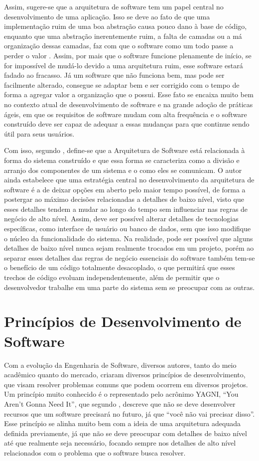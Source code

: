 \documentclass[12pt, %
openright, 
oneside, %
a4paper,    %
brazil]{facom-ufu-abntex2}
\begin{document}
Assim, sugere-se que a arquitetura de software tem um papel central no desenvolvimento de uma aplicação. Isso se deve ao fato de que uma implementação ruim de uma boa abstração causa pouco dano à base de código, enquanto que uma abstração inerentemente ruim, a falta de camadas ou a má organização dessas camadas, faz com que o software como um todo passe a perder o valor \cite{KIEHL}. Assim, por mais que o software funcione plenamente de início, se for impossível de mudá-lo devido a uma arquitetura ruim, esse software estará fadado ao fracasso. Já um software que não funciona bem, mas pode ser facilmente alterado, consegue se adaptar bem e ser corrigido com o tempo de forma a agregar valor a organização que o possui. Esse fato se encaixa muito bem no contexto atual de desenvolvimento de software e na grande adoção de práticas ágeis, em que os requisitos de software mudam com alta frequência e o software construído deve ser capaz de adequar a essas mudanças para que continue sendo útil para seus usuários.

Com isso, segundo , define-se que a Arquitetura de Software está relacionada à forma do sistema construído e que essa forma se caracteriza como a divisão e arranjo dos componentes de um sistema e o como eles se comunicam. O autor ainda estabelece que uma estratégia central no desenvolvimento da arquitetura de software é a de deixar opções em aberto pelo maior tempo possível, de forma a postergar ao máximo decisões relacionadas a detalhes de baixo nível, visto que esses detalhes tendem a mudar ao longo do tempo sem influenciar nas regras de negócio de alto nível. Assim, deve ser possível alterar detalhes de tecnologias específicas, como interface de usuário ou banco de dados, sem que isso modifique o núcleo da funcionalidade do sistema. Na realidade, pode ser possível que alguns detalhes de baixo nível nunca sejam realmente trocados em um projeto, porém ao separar esses detalhes das regras de negócio essenciais do software também tem-se o benefício de um código totalmente desacoplado, o que permitirá que esses trechos de código evoluam independentemente, além de permitir que o desenvolvedor trabalhe em uma parte do sistema sem se preocupar com as outras.

\section{Princípios de Desenvolvimento de Software}
Com a evolução da Engenharia de Software, diversos autores, tanto do meio acadêmico quanto do mercado, criaram diversos princípios de desenvolvimento, que visam resolver problemas comuns que podem ocorrem em diversos projetos. Um princípio muito conhecido é o representado pelo acrônimo YAGNI, ``You Aren't Gonna Need It'', que segundo , descreve que não se deve desenvolver recursos que um software precisará no futuro, já que ``você não vai precisar disso''. Esse princípio se alinha muito bem com a ideia de uma arquitetura adequada definida previamente, já que não se deve preocupar com detalhes de baixo nível até que realmente seja necessário, focando sempre nos detalhes de alto nível relacionados com o problema que o software busca resolver.
\end{document}
